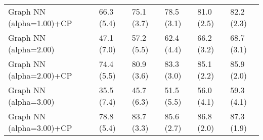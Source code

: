 \documentclass{article}
\begin{document}
\begin{table*}[t!]
\begin{center}
\begin{small}
\begin{sc}
\begin{tabular}{llllll}
Graph NN (alpha=1.00)+CP&66.3 (5.4)      &75.1 (3.7)      &78.5 (3.1)      &81.0 (2.5)      &82.2 (2.3)      \\
Graph NN (alpha=2.00)&47.1 (7.0)      &57.2 (5.5)      &62.4 (4.4)      &66.2 (3.2)      &68.7 (3.1)      \\
Graph NN (alpha=2.00)+CP&74.4 (5.5)      &80.9 (3.6)      &83.3 (3.0)      &85.1 (2.2)      &85.9 (2.0)      \\
Graph NN (alpha=3.00)&35.5 (7.4)      &45.7 (6.3)      &51.5 (5.5)      &56.0 (4.1)      &59.3 (4.1)      \\
Graph NN (alpha=3.00)+CP&78.8 (5.4)      &83.7 (3.3)      &85.6 (2.7)      &86.8 (2.0)      &87.3 (1.9)      \\
\bottomrule
\end{tabular}
\end{sc}
\end{small}
\end{center}
\vskip -0.1in
\end{table*}
\end{document}
